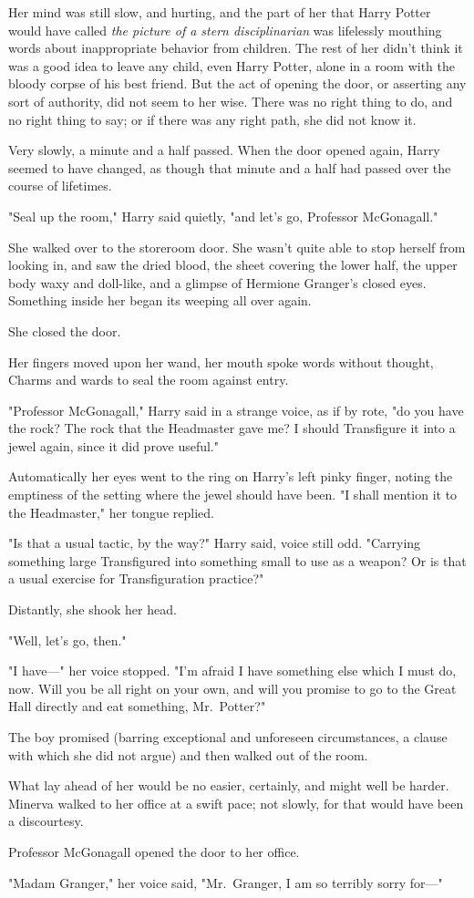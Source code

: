 Her mind was still slow, and hurting, and the part of her that Harry Potter
would have called \emph{the picture of a stern disciplinarian} was lifelessly
mouthing words about inappropriate behavior from children. The rest of her
didn't think it was a good idea to leave any child, even Harry Potter, alone in
a room with the bloody corpse of his best friend. But the act of opening the
door, or asserting any sort of authority, did not seem to her wise. There was
no right thing to do, and no right thing to say; or if there was any right
path, she did not know it.

Very slowly, a minute and a half passed.
\sbreak
When the door opened again, Harry seemed to have changed, as though that minute
and a half had passed over the course of lifetimes.

"Seal up the room," Harry said quietly, "and let's go, Professor McGonagall."

She walked over to the storeroom door. She wasn't quite able to stop herself
from looking in, and saw the dried blood, the sheet covering the lower half,
the upper body waxy and doll-like, and a glimpse of Hermione Granger's closed
eyes. Something inside her began its weeping all over again.

She closed the door.

Her fingers moved upon her wand, her mouth spoke words without thought, Charms
and wards to seal the room against entry.

"Professor McGonagall," Harry said in a strange voice, as if by rote, "do you
have the rock? The rock that the Headmaster gave me? I should Transfigure it
into a jewel again, since it did prove useful."

Automatically her eyes went to the ring on Harry's left pinky finger, noting
the emptiness of the setting where the jewel should have been. "I shall mention
it to the Headmaster," her tongue replied.

"Is that a usual tactic, by the way?" Harry said, voice still odd. "Carrying
something large Transfigured into something small to use as a weapon? Or is
that a usual exercise for Transfiguration practice?"

Distantly, she shook her head.

"Well, let's go, then."

"I have\mbox{---}" her voice stopped. "I'm afraid I have something else which I must
do, now. Will you be all right on your own, and will you promise to go to the
Great Hall directly and eat something, Mr.~Potter?"

The boy promised (barring exceptional and unforeseen circumstances, a clause
with which she did not argue) and then walked out of the room.

What lay ahead of her{\el} would be no easier, certainly, and might well be
harder.
\sbreak
Minerva walked to her office at a swift pace; not slowly, for that would have
been a discourtesy.

Professor McGonagall opened the door to her office.

"Madam Granger," her voice said, "Mr.~Granger, I am so terribly sorry for\mbox{---}"
